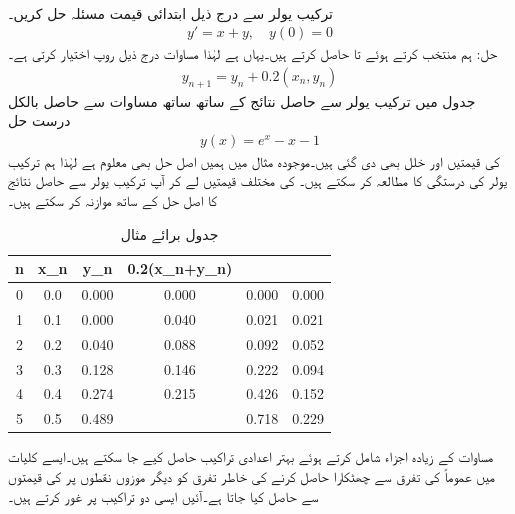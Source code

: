 \quad {}\\
ترکیب یولر سے درج ذیل ابتدائی قیمت مسئلہ حل کریں۔
\begin{align*}
y'=x+y,\quad y(0)=0
\end{align*}
حل:\quad
ہم  منتخب کرتے ہوئے  تا   حاصل کرتے ہیں۔یہاں  ہے لہٰذا مساوات  درج ذیل روپ اختیار کرتی ہے۔
\begin{align*}
y_{n+1}=y_n+0.2(x_n,y_n)
\end{align*}
جدول  میں ترکیب یولر سے حاصل نتائج کے ساتھ ساتھ مساوات  سے حاصل بالکل درست حل
\begin{align*}
y(x)=e^x-x-1
\end{align*}
کی قیمتیں اور خلل بھی دی گئی ہیں۔موجودہ مثال میں ہمیں اصل حل بھی معلوم ہے لہٰذا ہم ترکیب یولر کی درستگی کا مطالعہ کر سکتے ہیں۔ کی مختلف قیمتیں لے کر آپ ترکیب یولر سے حاصل نتائج کا اصل حل کے ساتھ موازنہ کر سکتے ہیں۔
\begin{table}
\caption{جدول برائے مثال }
\label{جدول_مثال_اعدادی_ترکیب_یولر_الف}
\centering
\begin{tabular}{C|C|C|C|C|C}
\hline
n&x_n&y_n&0.2(x_n+y_n)&&\\
&0.0&0.000&0.000&0.000&0.000\\
1&0.1&0.000&0.040&0.021&0.021\\
2&0.2&0.040&0.088&0.092&0.052\\
3&0.3&0.128&0.146&0.222&0.094\\
4&0.4&0.274&0.215&0.426&0.152\\
5&0.5&0.489&&0.718&0.229\\
\hline
\end{tabular}

\end{table}

مساوات  کے زیادہ اجزاء شامل کرتے ہوئے بہتر اعدادی تراکیب حاصل کیے جا سکتے ہیں۔ایسے کلیات میں عموماً  کی تفرق سے چھٹکارا حاصل کرنے کی خاطر تفرق   کو دیگر موزوں نقطوں پر  کی قیمتوں سے حاصل کیا جاتا  ہے۔آئیں ایسی دو تراکیب پر غور کرتے ہیں۔

